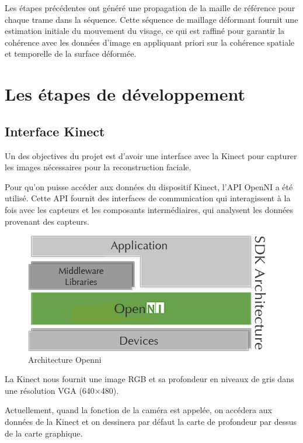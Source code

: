 \documentclass[a4paper,12pt]{article}
\begin{document}
Les étapes précédentes ont généré une propagation de la maille de
référence pour chaque trame dans la séquence. Cette séquence de
maillage déformant fournit une estimation initiale du mouvement du
visage, ce qui est raffiné pour garantir la cohérence avec les données
d'image en appliquant priori sur la cohérence spatiale et temporelle
de la surface déformée.


\section{Les étapes de développement}
\subsection*{Interface Kinect}

Un des objectives du projet est d’avoir une interface avec la Kinect
pour capturer les images nécessaires pour la reconstruction faciale.

Pour qu’on puisse accéder aux données du dispositif Kinect, l’API
OpenNI\cite{Openni2010} a été utilisé. Cette API fournit des
interfaces de communication qui interagissent à la fois avec les
capteurs et les composants intermédiaires, qui analysent les données
provenant des capteurs.

\begin{figure}[h!]
  \begin{center}
    \includegraphics[scale=0.4]{img/image03.png}
    \caption{Architecture Openni}
  \end{center}
\end{figure}


La Kinect nous fournit une image RGB et sa profondeur en niveaux de
gris dans une résolution VGA (640×480).

Actuellement, quand la fonction de la caméra est appelée, on accédera
aux données de la Kinect et on dessinera par défaut la carte de
profondeur par dessus de la carte graphique. 

\end{document}
